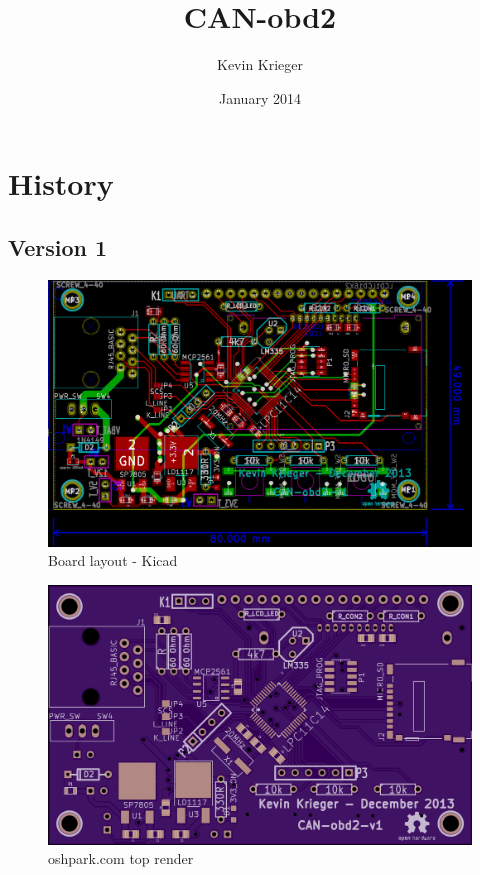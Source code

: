 \documentclass{article}
\title{CAN-obd2}
\author{Kevin Krieger}
\date{January 2014}
\begin{document}
\maketitle
\tableofcontents
\newpage

\section{History} \label{history}

\subsection{Version 1}

\begin{figure}[H]
\centering
\includegraphics[width=180mm,angle=90]{../images/board_layout.png}
\caption{Board layout - Kicad}
\label{}
\end{figure}

\begin{figure}[H]
\centering
\includegraphics[width=180mm,angle=90]{../images/canobd2v1top.png}
\caption{oshpark.com top render}
\label{}
\end{figure}
\end{document}
